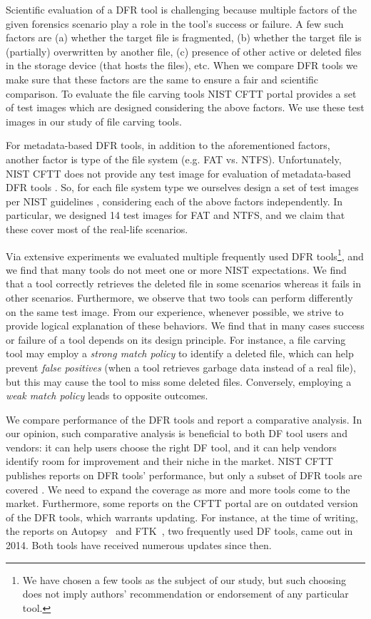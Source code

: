 Scientific evaluation of a DFR tool is challenging because multiple factors of the given forensics scenario play a role in the tool's success or failure.
A few such factors are (a) whether the target file is fragmented, (b) whether the target file is (partially) overwritten by another file, 
(c) presence of other active or deleted files in the storage device (that hosts the files), etc.
When we compare DFR tools we make sure that these factors are the same to ensure a fair and scientific comparison.
To evaluate the file carving tools NIST CFTT portal provides a set of test images which are designed considering the above factors.
We use these test images in our study of file carving tools. 

For metadata-based DFR tools, in addition to the aforementioned factors, another factor is type of the file system (e.g. FAT vs. NTFS). 
Unfortunately, NIST CFTT does not provide any test image for evaluation of metadata-based DFR tools \cite{meta:dfr:standards}.
So, for each file system type we ourselves design a set of test images per NIST guidelines \cite{meta:dfr:standards}, considering each of the above factors independently.
In particular, we designed 14 test images for FAT and NTFS, and we claim that these cover most of the real-life scenarios.


Via extensive experiments we evaluated multiple frequently used DFR tools\footnote{We have chosen a few tools as the subject of our study, 
but such choosing does not imply authors' recommendation or endorsement of any particular tool.}, and we find that many tools do not meet one or more NIST expectations.
We find that a tool correctly retrieves the deleted file in some scenarios whereas it fails in other scenarios. Furthermore, we observe that 
two tools can perform differently on the same test image. From our experience, whenever possible, 
we strive to provide logical explanation of these behaviors. We find that in many cases 
success or failure of a tool depends on its design principle. 
For instance, a file carving tool may employ a \emph{strong match policy} to identify a deleted file, which can help prevent \emph{false positives} (when a tool retrieves garbage data instead of a real file),
but this may cause the tool to miss some deleted files. Conversely, employing a \emph{weak match policy} leads to opposite outcomes. 
 
We compare performance of the DFR tools and report a comparative analysis. In our opinion, such comparative analysis is beneficial to both DF tool 
users and vendors: it can help users choose the right DF tool, and it can help vendors identify room for improvement and their niche in the market. 
NIST CFTT publishes reports on DFR tools' performance, but only a subset of DFR tools are covered \morecite. 
We need to expand the coverage as more and more tools come to the market.
Furthermore, some reports on the CFTT portal are on outdated version of the DFR tools, which warrants updating. 
For instance, at the time of writing, the reports on Autopsy~\cite{dhs:autopsy} and FTK~\cite{dhs:ftk}, two frequently used DF tools, came out in 2014. 
Both tools have received numerous updates since then.   

